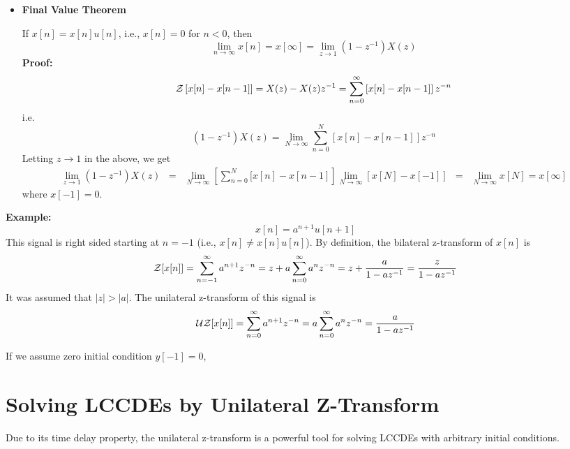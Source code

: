 \begin{itemize}
\item {\bf Final Value Theorem}

If $x[n]=x[n]u[n]$, i.e., $x[n]=0$ for $n<0$, then
\[ \lim_{n\rightarrow \infty}x[n]=x[\infty]
=\lim_{z\rightarrow 1}(1-z^{-1}) X(z)	\]
{\bf Proof: } 
\[ {\cal Z}\left[ x[n]-x[n-1]\right]=X(z)-X(z)z^{-1}
=\sum_{n=0}^\infty \left[ x[n]-x[n-1] \right]z^{-n} \]
i.e.
\[ (1-z^{-1})X(z)=\lim_{N\rightarrow \infty}\sum_{n=0}^N \left[ x[n]-x[n-1]\right]z^{-n}\]
Letting $z\rightarrow 1$ in the above, we get
\begin{eqnarray}
  \lim_{z\rightarrow 1}(1-z^{-1})X(z)
  &=&\lim_{N\rightarrow \infty}\left[ \sum_{n=0}^N [x[n]-x[n-1]\right]
    \lim_{N\rightarrow \infty}\left[ x[N]-x[-1]\right]
  &=&\lim_{N\rightarrow \infty} x[N]=x[\infty]
  \nonumber
\end{eqnarray}
where $x[-1]=0$.

\end{itemize}

{\bf Example:}
\[	x[n]=a^{n+1}u[n+1] 	\]
This signal is right sided starting at $n=-1$ (i.e., $x[n] \ne x[n]u[n]$).
By definition, the bilateral z-transform of $x[n]$ is
\[	{\cal Z}[x[n]]=\sum_{n=-1}^\infty a^{n+1}z^{-n}
	=z+a\sum_{n=0}^\infty a^n z^{-n}=z+\frac{a}{1-az^{-1}}
	=\frac{z}{1-az^{-1}}
\]
It was assumed that $|z|>|a|$. The unilateral z-transform of this signal is
\[ {\cal UZ}[x[n]]=\sum_{n=0}^\infty a^{n+1}z^{-n}
	=a\sum_{n=0}^\infty a^n z^{-n}=\frac{a}{1-az^{-1}}
\]

If we assume zero initial condition $y[-1]=0$, 

\newpage
\section*{Solving LCCDEs by Unilateral Z-Transform}

Due to its time delay property, the unilateral z-transform is a powerful 
tool for solving LCCDEs with arbitrary initial conditions. 

